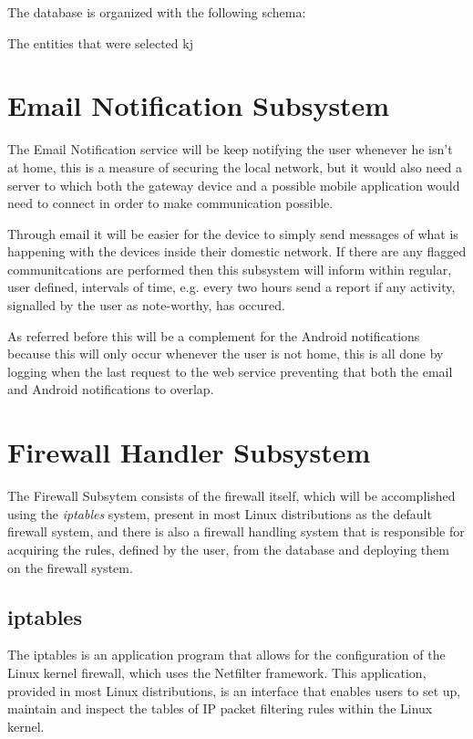 

The database is organized with the following schema:


The entities that were selected kj

\section{Email Notification Subsystem}
\label{chap4:sec:email-sys}
The Email Notification service will be keep notifying the user whenever he isn't
at home, this is a measure of securing the local network, but it would also need
a server to which both the gateway device and a possible mobile application
would need to connect in order to make communication possible.

Through email it will be easier for the device to simply send messages of what
is happening with the devices inside their domestic network. If there are any
flagged communitcations are performed then this subsystem will inform within
regular, user defined, intervals of time, e.g. every two hours send a report if
any activity, signalled by the user as note-worthy, has occured.

As referred before this will be a complement for the Android notifications
because this will only occur whenever the user is not home, this is all done by
logging when the last request to the web service preventing that both the email
and Android notifications to overlap.

\section{Firewall Handler Subsystem}
\label{chap4:sec:firewall-sys}
The Firewall Subsytem consists of the firewall itself, which will be
accomplished using the \emph{iptables} system, present in most Linux
distributions as the default firewall system, and there is also a firewall
handling system that is responsible for acquiring the rules, defined by the
user, from the database and deploying them on the firewall system.

\subsection{iptables}
\label{chap4:sec:firewall-sys:sub:iptables}
The iptables is an application program that allows for the configuration of the
Linux kernel firewall, which uses the Netfilter framework. This application,
provided in most Linux distributions, is an interface that enables users to
set up, maintain and inspect the tables of IP packet filtering rules within the
Linux kernel.

